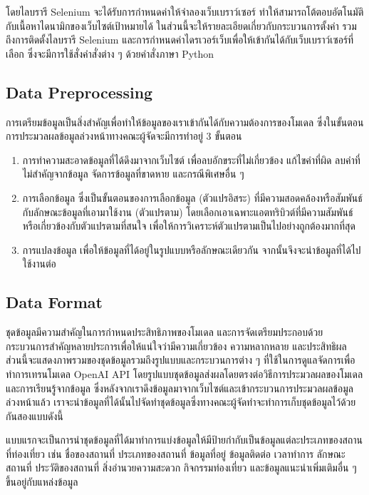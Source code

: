 \documentclass[12pt,oneside,openright,a4paper]{cpe-thai-project}
\begin{document}
โดยไลบรารี Selenium \cite{selenium} จะได้รับการกำหนดค่าให้จำลองเว็บเบราว์เซอร์ ทำให้สามารถโต้ตอบอัตโนมัติกับเนื้อหาไดนามิกของเว็บไซต์เป้าหมายได้ ในส่วนนี้จะให้รายละเอียดเกี่ยวกับกระบวนการตั้งค่า รวมถึงการติดตั้งไลบรารี Selenium และการกำหนดค่าไดรเวอร์เว็บเพื่อให้เข้ากันได้กับเว็บเบราว์เซอร์ที่เลือก ซึ่งจะมีการใช้สั่งคำสั่งต่าง ๆ ด้วยคำสั่งภาษา Python

\subsection{Data Preprocessing}
การเตรียมข้อมูลเป็นสิ่งสำคัญเพื่อทำให้ข้อมูลของเราเข้ากันได้กับความต้องการของโมเดล ซึ่งในขั้นตอนการประมวลผลข้อมูลล่วงหน้าทางคณะผู้จัดจะมีการทำอยู่ 3 ขั้นตอน
\begin{enumerate}
\item การทำความสะอาดข้อมูลที่ได้ดึงมาจากเว็บไซต์ เพื่อลบอักขระที่ไม่เกี่ยวข้อง แก้ไขคำที่ผิด ลบคำที่ไม่สำคัญจากข้อมูล จัดการข้อมูลที่ขาดหาย และกรณีพิเศษอื่น ๆ
\item การเลือกข้อมูล ซึ่งเป็นขั้นตอนของการเลือกข้อมูล (ตัวแปรอิสระ) ที่มีความสอดคล้องหรือสัมพันธ์กับลักษณะข้อมูลที่เอามาใช้งาน (ตัวแปรตาม) โดยเลือกเอาเฉพาะแอตทริบิวต์ที่มีความสัมพันธ์หรือเกี่ยวข้องกับตัวแปรตามที่สนใจ เพื่อให้การวิเคราะห์ตัวแปรตามเป็นไปอย่างถูกต้องมากที่สุด
\item การแปลงข้อมูล เพื่อให้ข้อมูลที่ได้อยู่ในรูปแบบหรือลักษณะเดียวกัน จากนั้นจึงจะนำข้อมูลที่ได้ไปใช้งานต่อ
\end{enumerate}

\subsection{Data Format}
ชุดข้อมูลมีความสำคัญในการกำหนดประสิทธิภาพของโมเดล และการจัดเตรียมประกอบด้วยกระบวนการสำคัญหลายประการเพื่อให้แน่ใจว่ามีความเกี่ยวข้อง ความหลากหลาย และประสิทธิผล ส่วนนี้จะแสดงภาพรวมของชุดข้อมูลรวมถึงรูปแบบและกระบวนการต่าง ๆ ที่ใช้ในการดูแลจัดการเพื่อทำการเทรนโมเดล OpenAI API โดยรูปแบบชุดข้อมูลส่งผลโดยตรงต่อวิธีการประมวลผลของโมเดลและการเรียนรู้จากข้อมูล ซึ่งหลังจากเราดึงข้อมูลมาจากเว็บไซต์และเข้ากระบวนการประมวลผลข้อมูลล่วงหน้าแล้ว เราจะนำข้อมูลที่ได้นั้นไปจัดทำชุดข้อมูลซึ่งทางคณะผู้จัดทำจะทำการเก็บชุดข้อมูลไว้ด้วยกันสองแบบดังนี้

แบบแรกจะเป็นการนำชุดข้อมูลที่ได้มาทำการแบ่งข้อมูลให้มีป้ายกำกับเป็นข้อมูลแต่ละประเภทของสถานที่ท่องเที่ยว เช่น ชื่อของสถานที่ ประเภทของสถานที่ ข้อมูลที่อยู่ ข้อมูลติดต่อ เวลาทำการ ลักษณะสถานที่ ประวัติของสถานที่ สิ่งอำนวยความสะดวก กิจกรรมท่องเที่ยว และข้อมูลแนะนำเพิ่มเติมอื่น ๆ ขึ้นอยู่กับแหล่งข้อมูล
	
\end{document}

